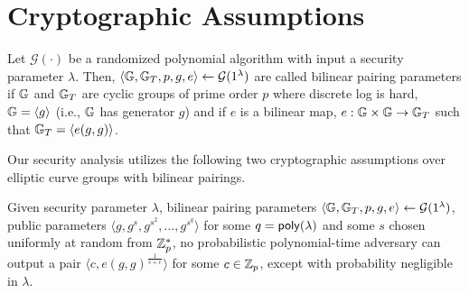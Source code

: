 \section{Cryptographic Assumptions}
\label{app:assumptions}

\begin{definition}
    \label{d:bilinear-pairing-parameters}
    Let $\mathcal{G}(\cdot)$ be a randomized polynomial algorithm with input a security parameter $\lambda$.
    Then, $\langle \mathbb{G}, \mathbb{G}_T, p, g, e\rangle \leftarrow \mathcal{G}(1^\lambda)$ are called bilinear pairing parameters if
    $\mathbb{G}$ and $\mathbb{G}_T$ are cyclic groups of prime order $p$ where discrete log is hard, 
    $\mathbb{G} = \langle g \rangle$ (i.e., $\mathbb{G}$ has generator $g$)
    and if $e$ is a bilinear map, $e : \mathbb{G}\times \mathbb{G} \rightarrow \mathbb{G}_T$ such that $\mathbb{G}_T = \langle e(g,g) \rangle$.
\end{definition}

Our security analysis utilizes the following two cryptographic assumptions over elliptic curve groups with bilinear pairings.
\begin{definition}
\label{d:q-sbdh}
Given security parameter $\lambda$, bilinear pairing parameters $\langle \mathbb{G}, \mathbb{G}_T, p, g, e\rangle \leftarrow \mathcal{G}(1^\lambda)$,
public parameters  $\langle g, g^s, g^{s^2},\allowbreak \dots, g^{s^q}\rangle$ for some $q = \mathsf{poly}(\lambda)$ and some $s$ chosen uniformly at random from $\mathbb{Z}_p^*$, no probabilistic polynomial-time adversary can output a pair $\langle c, e(g,g)^\frac{1}{s+c}\rangle$ for some $c \in \mathbb{Z}_p$, except with probability negligible in $\lambda$.
\end{definition}

